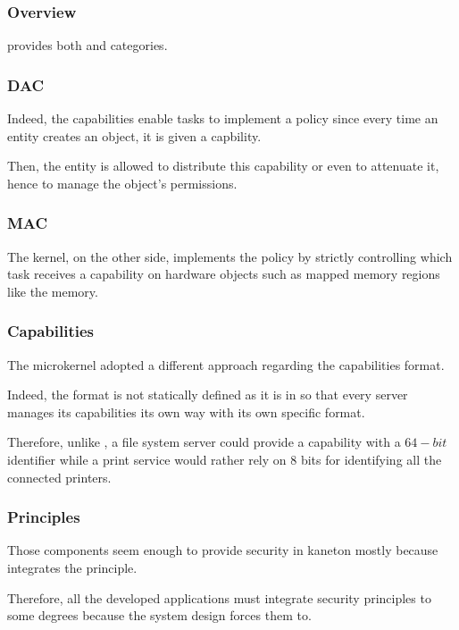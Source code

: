 
\begin{frame}
  \frametitle{Overview}

   provides both  and  categories.
\end{frame}


\begin{frame}
  \frametitle{DAC}

  Indeed, the capabilities enable tasks to implement a  policy since
  every time an entity creates an object, it is given a capbility.

  \-

  Then, the entity is allowed to distribute this capability or even to
  attenuate it, hence to manage the object's permissions.
\end{frame}


\begin{frame}
  \frametitle{MAC}

  The kernel, on the other side, implements the  policy by strictly
  controlling which task receives a capability on hardware objects such
  as mapped memory regions like the  memory.
\end{frame}


\begin{frame}
  \frametitle{Capabilities}

  The  microkernel adopted a different approach regarding the
  capabilities format.

  \-

  Indeed, the format is not statically defined as it is in  so
  that every server manages its capabilities its own way with its own specific
  format.

  \-

  Therefore, unlike , a file system server could provide a
  capability with a $64-bit$ identifier while a print service would rather
  rely on $8$ bits for identifying all the connected printers.
\end{frame}


\begin{frame}
  \frametitle{Principles}

  Those components seem enough to provide security in kaneton mostly
  because  integrates the  principle.

  \-

  Therefore, all the developed applications must integrate security
  principles to some degrees because the system design forces them to.
\end{frame}

